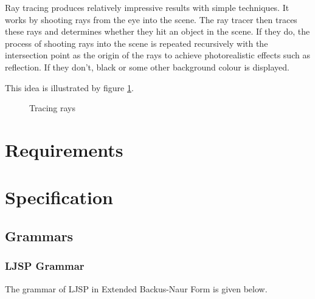 \documentclass[11pt]{report}
\begin{document}
Ray tracing produces relatively impressive results with simple techniques. It works by shooting rays from the eye into the scene. The ray tracer then traces these rays and determines whether they hit an object in the scene. If they do, the process of shooting rays into the scene is repeated recursively with the intersection point as the origin of the rays to achieve photorealistic effects such as reflection. If they don't, black or some other background colour is displayed.

This idea is illustrated by figure \ref{raytracingexplanation}.

\begin{figure}[ht]
\caption{Tracing rays}
\label{raytracingexplanation}
\end{figure}



\chapter{Requirements}

\chapter{Specification}
\section{Grammars}
\subsection{LJSP Grammar}
The grammar of LJSP in Extended Backus-Naur Form is given below.
\end{document}
